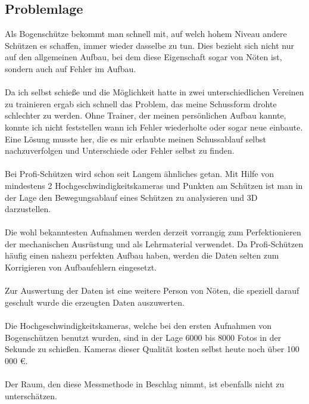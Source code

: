 \subsection{Problemlage}
Als Bogenschütze bekommt man schnell mit, auf welch hohem Niveau andere Schützen es 
schaffen, immer wieder dasselbe zu tun. Dies bezieht sich nicht nur auf den allgemeinen 
Aufbau, bei dem diese Eigenschaft sogar von Nöten ist, sondern auch auf Fehler im Aufbau.\\
\\
Da ich selbst schieße und die Möglichkeit hatte in zwei unterschiedlichen Vereinen zu 
trainieren ergab sich schnell das Problem, das meine Schussform drohte schlechter zu 
werden. Ohne Trainer, der meinen persönlichen Aufbau kannte, konnte ich nicht feststellen 
wann ich Fehler wiederholte oder sogar neue einbaute. Eine Lösung musste her, die es mir 
erlaubte meinen Schussablauf selbst nachzuverfolgen und Unterschiede oder Fehler selbst zu 
finden.\\
\\
Bei Profi-Schützen wird schon seit Langem ähnliches getan. Mit Hilfe von mindestens 2 
Hochgeschwindigkeitskameras und Punkten am Schützen ist man in der Lage den 
Bewegungsablauf eines Schützen zu analysieren und 3D darzustellen.\\
\\
Die wohl bekanntesten Aufnahmen werden derzeit vorrangig zum Perfektionieren der 
mechanischen Ausrüstung und als Lehrmaterial verwendet. Da Profi-Schützen häufig einen 
nahezu perfekten Aufbau haben, werden die Daten selten zum Korrigieren von Aufbaufehlern 
eingesetzt.\\
\\
Zur Auswertung der Daten ist eine weitere Person von Nöten, die speziell darauf geschult 
wurde die erzeugten Daten auszuwerten.\\
\\
Die Hochgeschwindigkeitskameras, welche bei den ersten Aufnahmen von Bogenschützen 
benutzt wurden, sind in der Lage 6000 bis 8000 Fotos in der Sekunde zu schießen. Kameras 
dieser Qualität kosten selbst heute noch über 100 000 €.\\
\\
Der Raum, den diese Messmethode in Beschlag nimmt, ist ebenfalls nicht zu unterschätzen.

